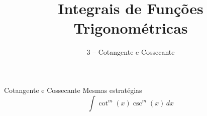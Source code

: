 \documentclass[fleqn,utf8,aspectratio=169,12pt]{beamer}
\title{Integrais de Funções Trigonométricas}
\subtitle{3 -- Cotangente e Cossecante}
\begin{document}
\addtitle

\begin{frame}{Cotangente e Cossecante}
  Mesmas estratégias
  \[
    \int \cot^m(x) \csc^m(x)\,dx
  \]
\end{frame}

%
%
%
%
%
%

\end{document}
